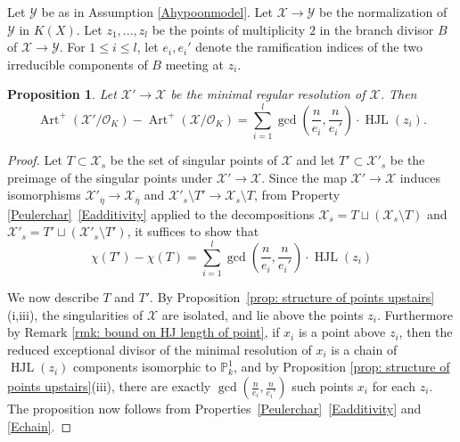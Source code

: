 \documentclass[12pt]{amsart}
\numberwithin{equation}{section}
\newtheorem{prop}[equation]{Proposition}
\theoremstyle{definition}
\newcommand{\padma}[1]{{\color{Magenta} \sf $\clubsuit\clubsuit\clubsuit$ Padma: [#1]}}
\newcommand{\mc}[1]{\mathcal{#1}}
\renewcommand{\P}{\mathbb P}
\newcommand{\X}{\mathcal{X}}
\newcommand{\Y}{\mathcal{Y}}
\DeclareMathOperator{\Art}{Art}
\DeclareMathOperator{\HJL}{HJL}
\begin{document}
Let $\Y$ be as in Assumption \ref{Ahypoonmodel}. Let $\X\to\Y$ be the
 normalization of $\Y$ in $K(X)$. Let $z_1,...,z_l$ be the points of multiplicity $2$ in the branch divisor $B$ of $\X\to\Y$. For $1\leq i\leq l$, let $e_i,e_i'$ denote the ramification indices of the two irreducible components of $B$ meeting at $z_i$.
\begin{prop}\label{Partincalculation}
Let $\mc{X}'\to\X$ be the minimal regular resolution of $\X$. Then  
  \[ \Art^+(\mc{X}'/\mc{O}_K)-\Art^+(\mc{X}/\mc{O}_K) = \sum_{i=1}^l 
     \gcd \left(\frac{n}{e_i},\frac{n}{e_i'} \right)
     \cdot\HJL(z_i).\]
\end{prop}
\begin{proof}
Let $T \subset \mc{X}_s$ be the set of singular points of $\mc{X}$ and
let $T' \subset \mc{X}'_s$ be the preimage of the singular points
under $\mc{X}' \rightarrow \mc{X}$. Since the map $\mc{X}' \rightarrow
\mc{X}$ induces isomorphisms $\mc{X}'_{\overline{\eta}} \rightarrow
\mc{X}_{\overline{\eta}}$ and $\mc{X}'_s \setminus T' \rightarrow
\mc{X}_s \setminus T$, from Property \ref{Peulerchar}~\ref{Eadditivity} applied to the decompositions $\mc{X}_s = T \sqcup (\mc{X}_s \setminus T)$ and $\mc{X}'_s = T' \sqcup (\mc{X}'_s \setminus T')$, it suffices to show that 
\[ \chi(T') - \chi(T) = \sum_{i=1}^l 
     \gcd \left(\frac{n}{e_i},\frac{n}{e_i'} \right)
     \cdot\HJL(z_i) \]

 We now describe $T$ and $T'$. By Proposition~\ref{prop: structure of points upstairs}(i,iii), the
 singularities of $\mc{X}$ are isolated, and lie above the points
 $z_i$. Furthermore by Remark \ref{rmk: bound on HJ length of point},
 if $x_i$ is a point above $z_i$, then the reduced exceptional divisor
 of the minimal resolution of $x_i$ is a
 chain of $\HJL(z_i)$ components isomorphic to $\P^1_k$, and by Proposition \ref{prop: structure of points upstairs}(iii), there
 are exactly $\gcd \left(\frac{n}{e_i},\frac{n}{e_i'} \right)$ such
 points $x_i$ for each $z_i$. The proposition now follows from
 Properties~\ref{Peulerchar}~\ref{Eadditivity} and \ref{Echain}.

\end{proof}
\end{document}
